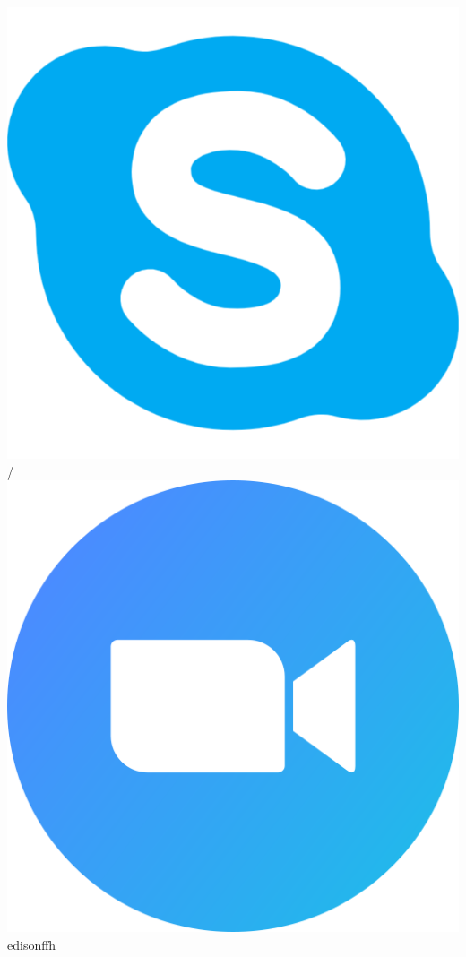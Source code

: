 \begin{center}
    \includegraphics[scale=0.023]{figs/skype_logo.png}
    /
    \includegraphics[scale=0.034]{figs/zoom.png}
    edisonffh
    \hspace*{5mm}

\end{center}
